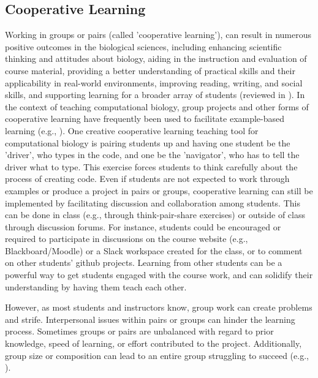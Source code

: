\subsection{Cooperative Learning} 

Working in groups or pairs (called 'cooperative learning'), can result in numerous positive outcomes in the biological sciences, including enhancing scientific thinking and attitudes about biology, aiding in the instruction and evaluation of course material, providing a better understanding of practical skills and their applicability in real-world environments, improving reading, writing, and social skills, and supporting learning for a broader array of students (reviewed in \cite{lord_101_2001}). 
In the context of teaching computational biology, group projects and other forms of cooperative learning have frequently been used to facilitate example-based learning (e.g., \cite{emery_application_2017,korcsmaros_teaching_2013,fuselier_trace_2011}).
One creative cooperative learning teaching tool for computational biology is pairing students up and having one student be the 'driver', who types in the code, and one be the 'navigator', who has to tell the driver what to type. 
This exercise forces students to think carefully about the process of creating code.
Even if students are not expected to work through examples or produce a project in pairs or groups, cooperative learning can still be implemented by facilitating discussion and collaboration among students.
This can be done in class (e.g., through think-pair-share exercises) or outside of class through discussion forums.
For instance, students could be encouraged or required to participate in discussions on the course website (e.g., Blackboard/Moodle) or a Slack workspace created for the class, or to comment on other students' github projects.
Learning from other students can be a powerful way to get students engaged with the course work, and can solidify their understanding by having them teach each other. 

However, as most students and instructors know, group work can create problems and strife.
Interpersonal issues within pairs or groups can hinder the learning process.
Sometimes groups or pairs are unbalanced with regard to prior knowledge, speed of learning, or effort contributed to the project.
Additionally, group size or composition can lead to an entire group struggling to succeed (e.g., \cite{compeau_establishing_2019}). 

